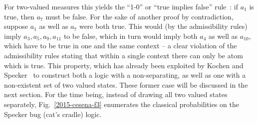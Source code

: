 For two-valued measures this yields the ``1-0'' or ``true implies false'' rule~\cite{svozil-2006-omni}:
if $a_1$ is true, then $a_7$ must be false.
For the sake of another proof by contradiction,
suppose $a_1$ as well as $a_7$ were both true.
This would (by the admissibility rules) imply $a_3, a_5, a_9, a_{11}$ to be false,
which in turn would imply both $a_4$ as well as $a_{10}$,
which have to be true  in one and the  same context -- a clear violation of the admissibility rules stating
that within a single context there can only be atom which is true.
This property,
which has already been exploited by Kochen and Specker~\cite[$\Gamma_1$]{kochen1}
to construct both a logic with a non-separating,
as well as one with a non-existent set of two valued states. These former case will be discussed in the next section.
For the time being, instead of drawing all two valued states separately,
Fig.~\ref{2015-cesena-f3}  enumerates
the classical probabilities on the Specker bug (cat's cradle) logic.
